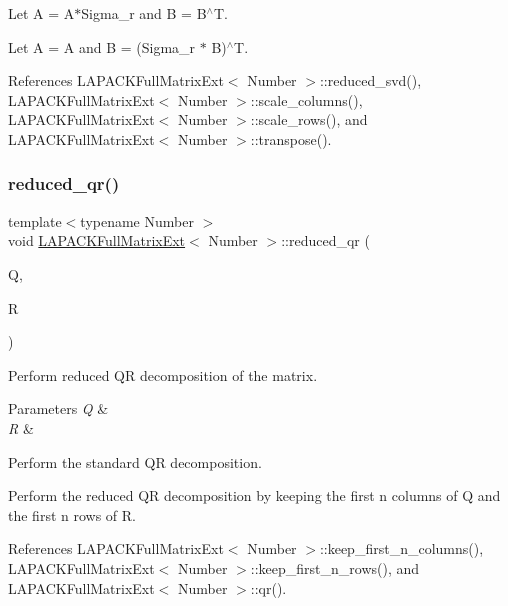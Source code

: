 Let A = A$\ast$\+Sigma\+\_\+r and B = B$^\wedge$T.

Let A = A and B = (Sigma\+\_\+r $\ast$ B)$^\wedge$T.

References L\+A\+P\+A\+C\+K\+Full\+Matrix\+Ext$<$ Number $>$\+::reduced\+\_\+svd(), L\+A\+P\+A\+C\+K\+Full\+Matrix\+Ext$<$ Number $>$\+::scale\+\_\+columns(), L\+A\+P\+A\+C\+K\+Full\+Matrix\+Ext$<$ Number $>$\+::scale\+\_\+rows(), and L\+A\+P\+A\+C\+K\+Full\+Matrix\+Ext$<$ Number $>$\+::transpose().

\mbox{\label{classLAPACKFullMatrixExt_a2d29694b336c319402fd867658a25253}} 
\subsubsection{\texorpdfstring{reduced\+\_\+qr()}{reduced\_qr()}}
{\footnotesize\ttfamily template$<$typename Number $>$ \\
void \hyperlink{classLAPACKFullMatrixExt}{L\+A\+P\+A\+C\+K\+Full\+Matrix\+Ext}$<$ Number $>$\+::reduced\+\_\+qr (\begin{DoxyParamCaption}\item[{\hyperlink{classLAPACKFullMatrixExt}{L\+A\+P\+A\+C\+K\+Full\+Matrix\+Ext}$<$ Number $>$ \&}]{Q,  }\item[{\hyperlink{classLAPACKFullMatrixExt}{L\+A\+P\+A\+C\+K\+Full\+Matrix\+Ext}$<$ Number $>$ \&}]{R }\end{DoxyParamCaption})}

Perform reduced QR decomposition of the matrix. 
\begin{DoxyParams}{Parameters}
{\em Q} & \\
\hline
{\em R} & \\
\hline
\end{DoxyParams}
Perform the standard QR decomposition.

Perform the reduced QR decomposition by keeping the first {\ttfamily n} columns of Q and the first {\ttfamily n} rows of R.

References L\+A\+P\+A\+C\+K\+Full\+Matrix\+Ext$<$ Number $>$\+::keep\+\_\+first\+\_\+n\+\_\+columns(), L\+A\+P\+A\+C\+K\+Full\+Matrix\+Ext$<$ Number $>$\+::keep\+\_\+first\+\_\+n\+\_\+rows(), and L\+A\+P\+A\+C\+K\+Full\+Matrix\+Ext$<$ Number $>$\+::qr().




